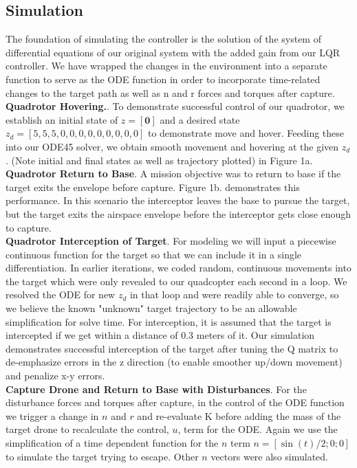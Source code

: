 \documentclass{article}
\begin{document}
\begin{multicols}{2}
\section*{Simulation}
\noindent
The foundation of simulating the controller is the solution of the system of differential equations of our original system with the added 
gain from our LQR controller.  We have wrapped the changes in the environment into a separate function to serve as the ODE 
function in order to incorporate time-related changes to the target path as well as n and r forces and torques after capture.\\
\textbf{Quadrotor Hovering.}. To demonstrate successful control of our quadrotor, we establish an initial state of $z=[\mathbf{0}]$ and 
a desired state $z_d=[5,5,5,0,0,0,0,0,0,0,0,0] $ to demonstrate move and hover.  Feeding these into our ODE45 solver, we obtain 
smooth movement and hovering at the given $z_d$.  (Note initial and final states as well as trajectory plotted) in Figure 1a.\\
\textbf{Quadrotor Return to Base}. A mission objective was to return to base if the target exits the envelope before capture.  
Figure 1b. demonstrates this performance. In this scenario the interceptor leaves the base to pursue the target, but the target exits 
the airspace envelope before the interceptor gets close enough to capture.\\
\textbf{Quadrotor Interception of Target}. For modeling we will input a piecewise continuous function for the target so that we can 
include it in a single differentiation.  In earlier iterations, we coded random, continuous movements into the target which were only 
revealed to our quadcopter each second in a loop.  We resolved the ODE for new $z_d$ in that loop and were readily able to converge, so we believe the known "unknown" target trajectory to be an allowable simplification for solve time.
For interception, it is assumed that the target is intercepted if we get within a distance of 0.3 meters of it.   Our simulation demonstrates 
successful interception of the target after tuning the Q matrix to de-emphasize errors in the z direction (to enable smoother up/down 
movement) and penalize x-y errors.  \\
\textbf{Capture Drone and Return to Base  with Disturbances}.  For the disturbance forces and torques after capture,  in the control of the ODE function we trigger a change in $n$ and $r$ and re-evaluate K before adding the mass of the target drone to recalculate the control, $u$, term for the ODE.  Again we use the simplification of a time dependent function for the $n$ term $n=[\sin(t)/2; 0; 0]$ to simulate the target trying to escape.  Other $n$ vectors were also simulated.\\

\end{multicols}
\end{document}
